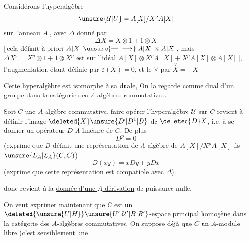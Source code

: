 Considérons l'hyperalgèbre
\[
\unsure{\mathcal U|U}=A[X]/X^pA[X]
\]
sur l'anneau $A$ , avec $\Delta$ donné par
\[
\boxed{\Delta X=X\otimes1+1\otimes X}
\]
[\,cela définit à priori $A[X]\mathrel{\unsure{\text{\textemdash}|\longrightarrow}}A[X]\otimes A[X]$, mais
$\Delta X^p=X^p\otimes1+1\otimes X^p$ est  sur l'idéal
$A[X]\otimes X^pA[X]+X^pA[X]\otimes A[X]$\,], l'augmentation étant définie par
 $\boxed{\varepsilon(X)=0}$, et le $\vee$ par $\boxed{\overset{\vee}{X}=-X}$

Cette hyperalgèbre est isomorphe à sa duale, 
On la regarde comme  dual d'un groupe dans la catégorie des $A$-algèbres commutatives.

Soit $C$ une $A$-algèbre commutative.  faire opérer l'hyperalgèbre $\mathcal U$ sur $C$ revient à définir l'image $\deleted{X}\unsure{D'|D^{1}|D}$ de $\deleted{D}X$, i.e. à se donner un opérateur $D$ $A$-linéaire de $C$. De plus
\[
D^p=0\tag*{(i)}
\]
(exprime que $D$ définit une représentation de $A$-algèbre de $A[X]/X^pA[X]$ ds $\unsure{L_A|\mathcal L_A}(C,C)$)
\[
D(xy)=xDy+yDx\tag*{(ii)}
\]
(exprime que cette représentation est compatible avec $\Delta$)

donc  revient à la \uline{donnée d'une $A$-dérivation} de puissance  nulle.

On veut exprimer maintenant que $C$ est un $\deleted{\unsure{U|H}}\unsure{U'|\mathcal U'|B|B'}$-espace \uline{principal} \uline{homogène} dans la catégorie des $A$-algèbres commutatives. On suppose  déjà que $C$   un $A$-module libre (c'est sensiblement une
